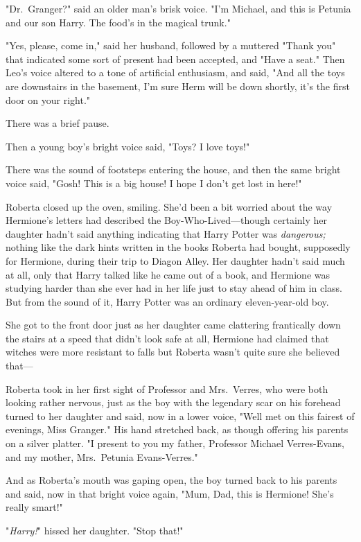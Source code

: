 "Dr.~Granger?" said an older man's brisk voice. "I'm Michael, and this is
Petunia and our son Harry. The food's in the magical trunk."

"Yes, please, come in," said her husband, followed by a muttered "Thank you"
that indicated some sort of present had been accepted, and "Have a seat." Then
Leo's voice altered to a tone of artificial enthusiasm, and said, "And all the
toys are downstairs in the basement, I'm sure Herm will be down shortly, it's
the first door on your right."

There was a brief pause.

Then a young boy's bright voice said, "Toys? I love toys!"

There was the sound of footsteps entering the house, and then the same bright
voice said, "Gosh! This is a big house! I hope I don't get lost in here!"

Roberta closed up the oven, smiling. She'd been a bit worried about the way
Hermione's letters had described the Boy-Who-Lived—though certainly her
daughter hadn't said anything indicating that Harry Potter was
\emph{dangerous;} nothing like the dark hints written in the books Roberta had
bought, supposedly for Hermione, during their trip to Diagon Alley. Her
daughter hadn't said much at all, only that Harry talked like he came out of a
book, and Hermione was studying harder than she ever had in her life just to
stay ahead of him in class. But from the sound of it, Harry Potter was an
ordinary eleven-year-old boy.

She got to the front door just as her daughter came clattering frantically down
the stairs at a speed that didn't look safe at all, Hermione had claimed that
witches were more resistant to falls but Roberta wasn't quite sure she believed
that—

Roberta took in her first sight of Professor and Mrs.~Verres, who were both
looking rather nervous, just as the boy with the legendary scar on his forehead
turned to her daughter and said, now in a lower voice, "Well met on this
fairest of evenings, Miss Granger." His hand stretched back, as though offering
his parents on a silver platter. "I present to you my father, Professor Michael
Verres-Evans, and my mother, Mrs.~Petunia Evans-Verres."

And as Roberta's mouth was gaping open, the boy turned back to his parents and
said, now in that bright voice again, "Mum, Dad, this is Hermione! She's really
smart!"

"\emph{Harry!}" hissed her daughter. "Stop that!"

